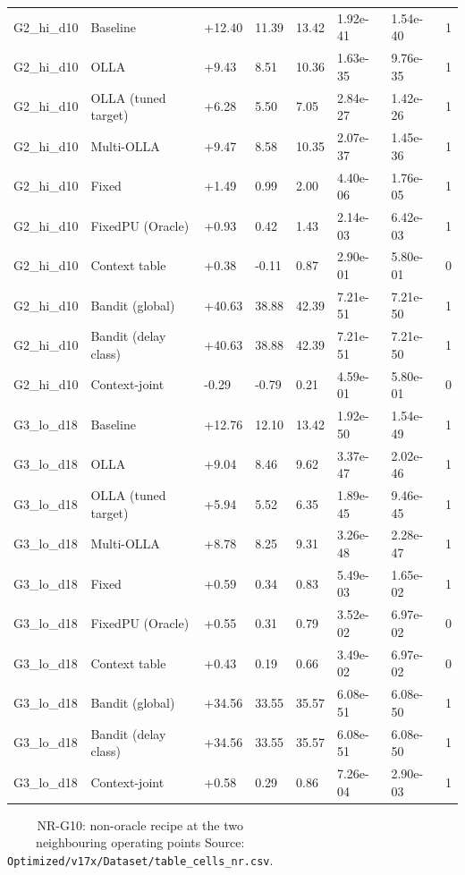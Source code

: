 \documentclass[10pt]{article}
\begin{document}
\begin{landscape}
\begin{longtable}{@{}llllllll@{}}
\midrule
\endhead
G2\_hi\_d10 & Baseline & +12.40 & 11.39 & 13.42 & 1.92e-41 & 1.54e-40 & 1 \\
G2\_hi\_d10 & OLLA & +9.43 & 8.51 & 10.36 & 1.63e-35 & 9.76e-35 & 1 \\
G2\_hi\_d10 & OLLA (tuned target) & +6.28 & 5.50 & 7.05 & 2.84e-27 & 1.42e-26 & 1 \\
G2\_hi\_d10 & Multi-OLLA & +9.47 & 8.58 & 10.35 & 2.07e-37 & 1.45e-36 & 1 \\
G2\_hi\_d10 & Fixed & +1.49 & 0.99 & 2.00 & 4.40e-06 & 1.76e-05 & 1 \\
G2\_hi\_d10 & FixedPU (Oracle) & +0.93 & 0.42 & 1.43 & 2.14e-03 & 6.42e-03 & 1 \\
G2\_hi\_d10 & Context table & +0.38 & -0.11 & 0.87 & 2.90e-01 & 5.80e-01 & 0 \\
G2\_hi\_d10 & Bandit (global) & +40.63 & 38.88 & 42.39 & 7.21e-51 & 7.21e-50 & 1 \\
G2\_hi\_d10 & Bandit (delay class) & +40.63 & 38.88 & 42.39 & 7.21e-51 & 7.21e-50 & 1 \\
G2\_hi\_d10 & Context-joint & -0.29 & -0.79 & 0.21 & 4.59e-01 & 5.80e-01 & 0 \\
G3\_lo\_d18 & Baseline & +12.76 & 12.10 & 13.42 & 1.92e-50 & 1.54e-49 & 1 \\
G3\_lo\_d18 & OLLA & +9.04 & 8.46 & 9.62 & 3.37e-47 & 2.02e-46 & 1 \\
G3\_lo\_d18 & OLLA (tuned target) & +5.94 & 5.52 & 6.35 & 1.89e-45 & 9.46e-45 & 1 \\
G3\_lo\_d18 & Multi-OLLA & +8.78 & 8.25 & 9.31 & 3.26e-48 & 2.28e-47 & 1 \\
G3\_lo\_d18 & Fixed & +0.59 & 0.34 & 0.83 & 5.49e-03 & 1.65e-02 & 1 \\
G3\_lo\_d18 & FixedPU (Oracle) & +0.55 & 0.31 & 0.79 & 3.52e-02 & 6.97e-02 & 0 \\
G3\_lo\_d18 & Context table & +0.43 & 0.19 & 0.66 & 3.49e-02 & 6.97e-02 & 0 \\
G3\_lo\_d18 & Bandit (global) & +34.56 & 33.55 & 35.57 & 6.08e-51 & 6.08e-50 & 1 \\
G3\_lo\_d18 & Bandit (delay class) & +34.56 & 33.55 & 35.57 & 6.08e-51 & 6.08e-50 & 1 \\
G3\_lo\_d18 & Context-joint & +0.58 & 0.29 & 0.86 & 7.26e-04 & 2.90e-03 & 1 \\
\bottomrule
\end{longtable}
\normalsize
\tiny
\setlength{\tabcolsep}{2pt}
\begin{longtable}{@{}llllllll@{}}
\caption{NR-G10: non-oracle recipe at the two neighbouring operating points Source: \texttt{Optimized/v17x/Dataset/table\_cells\_nr.csv}.}\\

\end{longtable}
\end{landscape}
\end{document}
